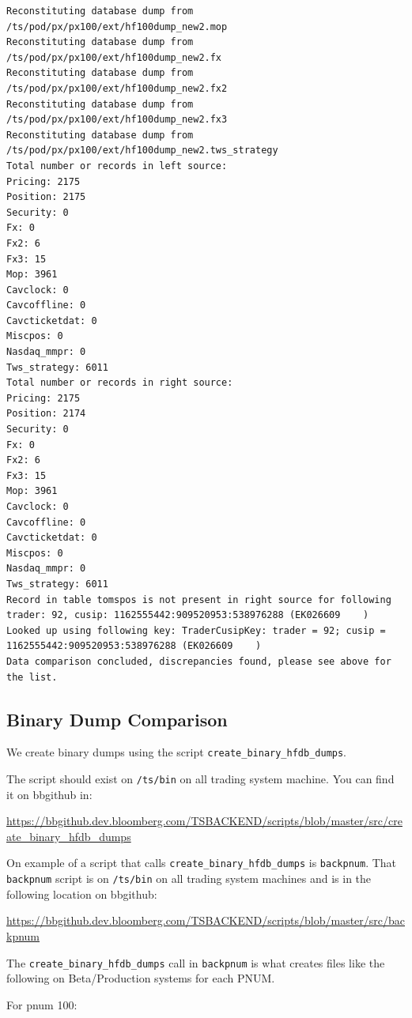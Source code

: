 \documentclass[8pt,]{article}
\begin{document}
\begin{verbatim}
Reconstituting database dump from /ts/pod/px/px100/ext/hf100dump_new2.mop
Reconstituting database dump from /ts/pod/px/px100/ext/hf100dump_new2.fx
Reconstituting database dump from /ts/pod/px/px100/ext/hf100dump_new2.fx2
Reconstituting database dump from /ts/pod/px/px100/ext/hf100dump_new2.fx3
Reconstituting database dump from /ts/pod/px/px100/ext/hf100dump_new2.tws_strategy
Total number or records in left source:
Pricing: 2175
Position: 2175
Security: 0
Fx: 0
Fx2: 6
Fx3: 15
Mop: 3961
Cavclock: 0
Cavcoffline: 0
Cavcticketdat: 0
Miscpos: 0
Nasdaq_mmpr: 0
Tws_strategy: 6011
Total number or records in right source:
Pricing: 2175
Position: 2174
Security: 0
Fx: 0
Fx2: 6
Fx3: 15
Mop: 3961
Cavclock: 0
Cavcoffline: 0
Cavcticketdat: 0
Miscpos: 0
Nasdaq_mmpr: 0
Tws_strategy: 6011
Record in table tomspos is not present in right source for following trader: 92, cusip: 1162555442:909520953:538976288 (EK026609    )
Looked up using following key: TraderCusipKey: trader = 92; cusip = 1162555442:909520953:538976288 (EK026609    )
Data comparison concluded, discrepancies found, please see above for the list.
\end{verbatim}

\subsection{Binary Dump Comparison}\label{binary-dump-comparison}

We create binary dumps using the script
\texttt{create\_binary\_hfdb\_dumps}.

The script should exist on \texttt{/ts/bin} on all trading system
machine. You can find it on bbgithub in:

\url{https://bbgithub.dev.bloomberg.com/TSBACKEND/scripts/blob/master/src/create_binary_hfdb_dumps}

On example of a script that calls \texttt{create\_binary\_hfdb\_dumps}
is \texttt{backpnum}. That \texttt{backpnum} script is on
\texttt{/ts/bin} on all trading system machines and is in the following
location on bbgithub:

\url{https://bbgithub.dev.bloomberg.com/TSBACKEND/scripts/blob/master/src/backpnum}

The \texttt{create\_binary\_hfdb\_dumps} call in \texttt{backpnum} is
what creates files like the following on Beta/Production systems for
each PNUM.

For pnum 100:
\end{document}
